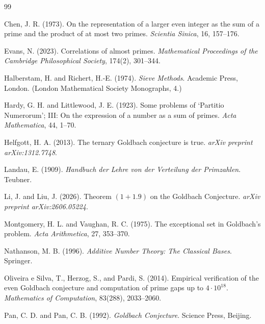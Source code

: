 \documentclass[]{interact}%
\begin{document}
\begin{thebibliography}{99}

Chen, J. R. (1973).
\newblock On the representation of a larger even integer as the sum of a prime and the product of at most two primes.
\newblock \emph{Scientia Sinica}, 16, 157--176.

Evans, N. (2023).
\newblock Correlations of almost primes.
\newblock \emph{Mathematical Proceedings of the Cambridge Philosophical Society}, 174(2), 301--344.

Halberstam, H. and Richert, H.-E. (1974).
\newblock \emph{Sieve Methods}.
\newblock Academic Press, London. (London Mathematical Society Monographs, 4.)

Hardy, G. H. and Littlewood, J. E. (1923).
\newblock Some problems of `Partitio Numerorum'; III: On the expression of a number as a sum of primes.
\newblock \emph{Acta Mathematica}, 44, 1--70.

Helfgott, H. A. (2013).
\newblock The ternary Goldbach conjecture is true.
\newblock \emph{arXiv preprint arXiv:1312.7748}.

Landau, E. (1909).
\newblock \emph{Handbuch der Lehre von der Verteilung der Primzahlen}.
\newblock Teubner.

Li, J. and Liu, J. (2026).
\newblock Theorem $(1+1.9)$ on the Goldbach Conjecture.
\newblock \emph{arXiv preprint arXiv:2606.05224}.

Montgomery, H. L. and Vaughan, R. C. (1975).
\newblock The exceptional set in Goldbach's problem.
\newblock \emph{Acta Arithmetica}, 27, 353--370.

Nathanson, M. B. (1996).
\newblock \emph{Additive Number Theory: The Classical Bases}.
\newblock Springer.

Oliveira e Silva, T., Herzog, S., and Pardi, S. (2014).
\newblock Empirical verification of the even Goldbach conjecture and computation of prime gaps up to $4\cdot10^{18}$.
\newblock \emph{Mathematics of Computation}, 83(288), 2033--2060.

Pan, C. D. and Pan, C. B. (1992).
\newblock \emph{Goldbach Conjecture}.
\newblock Science Press, Beijing.


\end{thebibliography}
\end{document}
